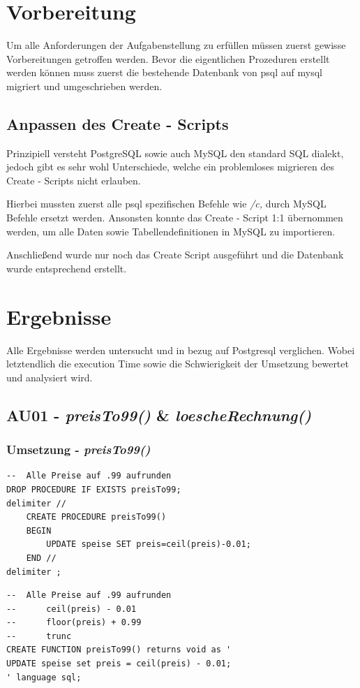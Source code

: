 \clearpage

\section{Vorbereitung}
Um alle Anforderungen der Aufgabenstellung zu erfüllen müssen zuerst gewisse Vorbereitungen getroffen werden.
Bevor die eigentlichen Prozeduren erstellt werden können muss zuerst die bestehende Datenbank von psql auf mysql migriert und umgeschrieben werden.

\subsection{Anpassen des Create - Scripts}
Prinzipiell versteht PostgreSQL sowie auch MySQL den standard SQL dialekt, jedoch gibt es sehr wohl Unterschiede, welche ein problemloses migrieren des Create - Scripts nicht erlauben.

Hierbei mussten zuerst alle psql spezifischen Befehle wie \textit{/c,} durch MySQL Befehle ersetzt werden. Ansonsten konnte das Create - Script 1:1 übernommen werden, um alle Daten sowie Tabellendefinitionen in MySQL zu importieren.

Anschließend wurde nur noch das Create Script ausgeführt und die Datenbank wurde entsprechend erstellt.

\section{Ergebnisse}
Alle Ergebnisse werden untersucht und in bezug auf Postgresql verglichen. Wobei letztendlich die execution Time sowie die Schwierigkeit der Umsetzung bewertet und analysiert wird.

\subsection{AU01 - \textit{preisTo99()} \& \textit{loescheRechnung()}}
\subsubsection{Umsetzung - \textit{preisTo99()}}
\vspace{0.3cm}
\begin{minipage}{.5\textwidth}
	\begin{lstlisting}[style=sql1, caption={preisTo99() - MySQL}]
--	Alle Preise auf .99 aufrunden
DROP PROCEDURE IF EXISTS preisTo99;
delimiter //
	CREATE PROCEDURE preisTo99() 
	BEGIN
		UPDATE speise SET preis=ceil(preis)-0.01;
	END //
delimiter ;
	\end{lstlisting}
\end{minipage}%
\begin{minipage}{.5\textwidth}
	\begin{lstlisting}[style=sql, caption={preisTo99() - PSQL}]
--	Alle Preise auf .99 aufrunden
--		ceil(preis) - 0.01
--		floor(preis) + 0.99
--		trunc
CREATE FUNCTION preisTo99() returns void as '
UPDATE speise set preis = ceil(preis) - 0.01;
' language sql;
	\end{lstlisting}
\end{minipage}

